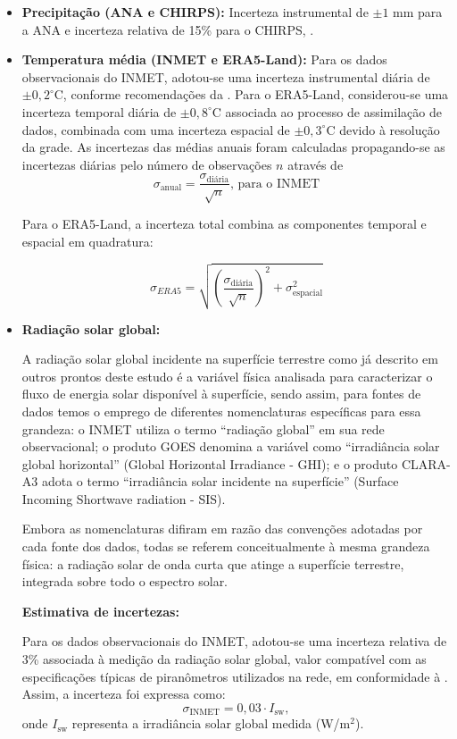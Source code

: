 \begin{itemize}
    \item \textbf{Precipitação (ANA e CHIRPS):} Incerteza instrumental de $\pm 1$ mm para a ANA e incerteza relativa de 15\% para o CHIRPS, \citep{funk2015}.
    \item \textbf{Temperatura média (INMET e ERA5-Land):} 
    Para os dados observacionais do INMET, adotou-se uma incerteza instrumental diária de $\pm 0{,}2^\circ$C, conforme recomendações da \cite{wmo2025}. Para o ERA5-Land, considerou-se uma incerteza temporal diária de $\pm 0{,}8^\circ$C associada ao processo de assimilação de dados, combinada com uma incerteza espacial de $\pm 0{,}3^\circ$C devido à resolução da grade. As incertezas das médias anuais foram calculadas propagando-se as incertezas diárias pelo número de observações $n$ através de 
    \[\sigma_{\text{anual}} = \frac{\sigma_{\text{diária}}}{\sqrt{n}} \text{, para o INMET}
    \] 
    
    Para o ERA5-Land, a incerteza total combina as componentes temporal e espacial em quadratura: 
    
    \[
    \sigma_{ERA5} =
    \sqrt{
    \left(\frac{\sigma_{\text{diária}}}{\sqrt{n}}\right)^2 +
    \sigma_{\text{espacial}}^2
    }
    \]
    
    \item \textbf{Radiação solar global:} 
    
    A radiação solar global incidente na superfície terrestre como já descrito em outros prontos deste estudo é a variável física analisada para caracterizar o fluxo de energia solar disponível à superfície, sendo assim, para fontes de dados temos o emprego de diferentes nomenclaturas específicas para essa grandeza: o INMET utiliza o termo ``radiação global'' em sua rede observacional; o produto GOES denomina a variável como 
    ``irradiância solar global horizontal'' (Global Horizontal Irradiance - GHI); e o produto CLARA-A3 adota o termo ``irradiância solar incidente na superfície'' (Surface Incoming Shortwave radiation - SIS). 
    
    Embora as nomenclaturas difiram em razão das convenções adotadas por cada fonte dos dados, todas se referem conceitualmente à mesma grandeza física: a radiação solar de onda curta que atinge a superfície terrestre, integrada sobre todo o espectro solar.
    
    \textbf{Estimativa de incertezas:}
    
    Para os dados observacionais do INMET, adotou-se uma incerteza relativa de 3\% associada 
    à medição da radiação solar global, valor compatível com as especificações típicas de 
    piranômetros utilizados na rede, em conformidade à \cite{wmo2025}. Assim, a incerteza foi 
    expressa como:
    \begin{equation}
    \sigma_{\text{INMET}} = 0{,}03 \cdot I_{\text{sw}},
    \end{equation}
    \noindent onde $I_{\text{sw}}$ representa a irradiância solar global medida (W/m$^2$).
    

\end{itemize}
